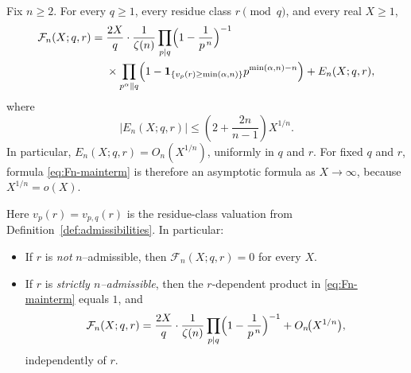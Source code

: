 \documentclass[10pt,a4paper]{amsart}
\begin{document}
\begin{theorem}\label{thm:equidistribution}
Fix $n\ge2$. For every $q\ge1$, every residue class $r\pmod q$, and every real $X\ge1$,
\begin{equation}\label{eq:Fn-mainterm}
\begin{aligned}
\mathcal F_n(X;q,r)
={}&
\frac{2X}{q}\cdot\frac{1}{\zeta(n)}
\prod_{p\mid q}\Bigl(1-\frac1{p^{\,n}}\Bigr)^{-1}\\
&\times
\prod_{p^\alpha\parallel q}
\Bigl(1-\mathbf 1_{\{v_p(r)\ge \min(\alpha,n)\}}
      p^{\min(\alpha,n)-n}\Bigr)
+E_n(X;q,r),
\end{aligned}
\end{equation}
where
\begin{equation}\label{eq:Fn-error-explicit}
\bigl|E_n(X;q,r)\bigr|
\le
\left(2+\frac{2n}{n-1}\right)X^{1/n}.
\end{equation}
In particular, $E_n(X;q,r)=O_n(X^{1/n})$, uniformly in $q$ and $r$.
For fixed $q$ and $r$, formula \eqref{eq:Fn-mainterm} is therefore an asymptotic formula as
$X\to\infty$, because $X^{1/n}=o(X)$.

Here $v_p(r)=v_{p,q}(r)$ is the residue-class valuation from Definition~\ref{def:admissibilities}.
In particular:
\begin{itemize}
\item If $r$ is \emph{not} $n$--admissible, then $\mathcal F_n(X;q,r)=0$ for every $X$.
\item If $r$ is \emph{strictly $n$--admissible}, then the $r$-dependent product in
\eqref{eq:Fn-mainterm} equals $1$, and
\[
\mathcal F_n(X;q,r)=
\frac{2X}{q}\cdot\frac{1}{\zeta(n)}
\prod_{p\mid q}\Bigl(1-\frac1{p^{\,n}}\Bigr)^{-1}
+O_n\!\bigl(X^{1/n}\bigr),
\]
independently of $r$.
\end{itemize}
\end{theorem}
\end{document}

